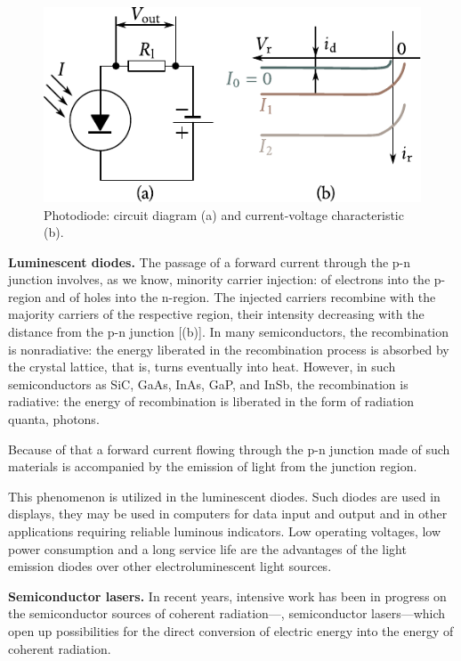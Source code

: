 \begin{figure}[t]
	\begin{center}
		\includegraphics[scale=1.0]{figures/ch_08/fig_8_24.pdf}
		\caption[]{Photodiode: circuit diagram (a) and current-voltage characteristic (b).}
		\label{fig:8_24}
	\end{center}
	\vspace{-0.8cm}
\end{figure}

\textbf{Luminescent diodes.} The passage of a forward current through the p-n junction involves, as we know, minority carrier injection: of electrons into the p-region and of holes into the n-region. The injected carriers recombine with the majority carriers of the respective region, their intensity decreasing with the distance from the p-n junction [(b)]. In many semiconductors, the recombination is nonradiative: the energy liberated in the recombination process is absorbed by the crystal lattice, that is, turns eventually into heat. However, in such semiconductors as SiC, GaAs, InAs, GaP, and InSb, the recombination is radiative: the energy of recombination is liberated in the form of radiation quanta, photons.

Because of that a forward current flowing through the p-n junction made of such materials is accompanied by the emission of light from the junction region.

This phenomenon is utilized in the luminescent diodes. Such diodes are used in displays, they may be used in computers for data input and output and  in other applications requiring reliable luminous indicators. Low operating voltages, low power consumption and a long service life are the advantages of the light emission diodes over other electroluminescent light sources.

\textbf{Semiconductor lasers.} In recent years, intensive work has been in progress on the semiconductor sources of coherent radiation---\ie, semiconductor lasers---which open up possibilities for the direct conversion of electric energy into the energy of coherent radiation.

